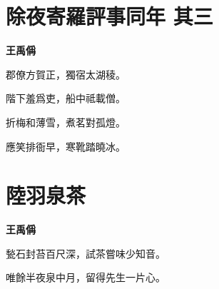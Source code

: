 \documentclass[12pt,a4paper]{ctexbook}
\begin{document}
\section{除夜寄羅評事同年  其三}
\textbf{王禹偁}\par\vspace{0.5em}
郡僚方賀正，獨宿太湖稜。\par
階下羞爲吏，船中祗載僧。\par
折梅和薄雪，煮茗對孤燈。\par
應笑排衙早，寒靴踏曉冰。\par

\section{陸羽泉茶}
\textbf{王禹偁}\par\vspace{0.5em}
甃石封苔百尺深，試茶嘗味少知音。\par
唯餘半夜泉中月，留得先生一片心。\par
\end{document}
